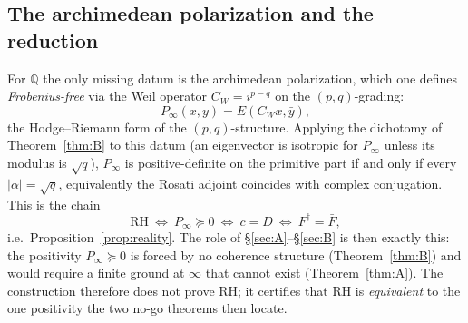 \documentclass[11pt,reqno]{amsart}
\theoremstyle{plain}
\theoremstyle{definition}
\theoremstyle{remark}
\newcommand{\Q}{\mathbb{Q}}
\newcommand{\dg}{^{\dagger}}
\begin{document}
\subsection{The archimedean polarization and the reduction}
For $\Q$ the only missing datum is the archimedean polarization, which one defines \emph{Frobenius-free} via
the Weil operator $C_W=i^{p-q}$ on the $(p,q)$-grading:
\[
P_\infty(x,y)=E(C_W x,\bar y),
\]
the Hodge--Riemann form of the $(p,q)$-structure. Applying the dichotomy of Theorem~\ref{thm:B} to this datum
(an eigenvector is isotropic for $P_\infty$ unless its modulus is $\sqrt q$), $P_\infty$ is positive-definite
on the primitive part if and only if every $|\alpha|=\sqrt q$, equivalently the Rosati adjoint coincides with
complex conjugation. This is the chain
\[
\mathrm{RH}\ \Longleftrightarrow\ P_\infty\succeq0\ \Longleftrightarrow\ c=D\ \Longleftrightarrow\ F\dg=\bar F,
\]
i.e.\ Proposition~\ref{prop:reality}. The role of \S\ref{sec:A}--\S\ref{sec:B} is then exactly this: the
positivity $P_\infty\succeq0$ is forced by no coherence structure (Theorem~\ref{thm:B}) and would require a
finite ground at $\infty$ that cannot exist (Theorem~\ref{thm:A}). The construction therefore does not prove
RH; it certifies that RH is \emph{equivalent} to the one positivity the two no-go theorems then locate.
\end{document}
